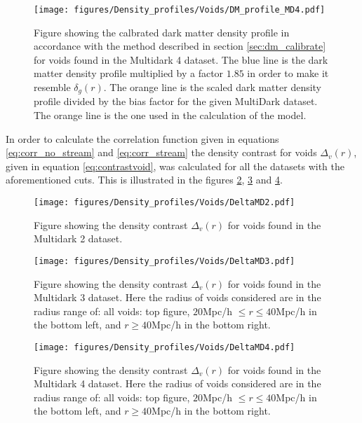 \begin{figure}[H]
    \texttt{[image: figures/Density\_profiles/Voids/DM\_profile\_MD4.pdf]}
    \caption{Figure showing the calbrated dark matter density profile in accordance with the method described in section \ref{sec:dm_calibrate} for voids found in the Multidark 4 dataset. The blue line is the dark matter density profile multiplied by a factor $1.85$ in order to make it resemble $\delta_g(r)$. The orange line is the scaled dark matter density profile divided by the bias factor for the given MultiDark dataset. The orange line is the one used in the calculation of the model.}
    \label{fig:deltadmMD4}
\end{figure}
In order to calculate the correlation function given in equations \ref{eq:corr_no_stream} and \ref{eq:corr_stream} the density contrast for voids $\Delta_v(r)$, given in equation \ref{eq:contrastvoid}, was calculated for all the datasets with the aforementioned cuts. This is illustrated in the figures \ref{fig:DeltaMD2}, \ref{fig:DeltaMD3} and \ref{fig:DeltaMD4}. 
\begin{figure}[H]
    \texttt{[image: figures/Density\_profiles/Voids/DeltaMD2.pdf]}
    \caption{Figure showing the density contrast $\Delta_v(r)$ for voids found in the Multidark 2 dataset.}
    \label{fig:DeltaMD2}
\end{figure}
\begin{figure}[H]
    \texttt{[image: figures/Density\_profiles/Voids/DeltaMD3.pdf]}
    \caption{Figure showing the density contrast $\Delta_v(r)$ for voids found in the Multidark 3 dataset. Here the radius of voids considered are in the radius range of: all voids: top figure, $20$Mpc/h $\leq r\leq 40$Mpc/h in the bottom left, and $r\geq 40$Mpc/h in the bottom right.}
    \label{fig:DeltaMD3}
\end{figure}
\begin{figure}[H]
    \texttt{[image: figures/Density\_profiles/Voids/DeltaMD4.pdf]}
    \caption{Figure showing the density contrast $\Delta_v(r)$ for voids found in the Multidark 4 dataset. Here the radius of voids considered are in the radius range of: all voids: top figure, $20$Mpc/h $\leq r\leq 40$Mpc/h in the bottom left, and $r\geq 40$Mpc/h in the bottom right.}
    \label{fig:DeltaMD4}
\end{figure}

